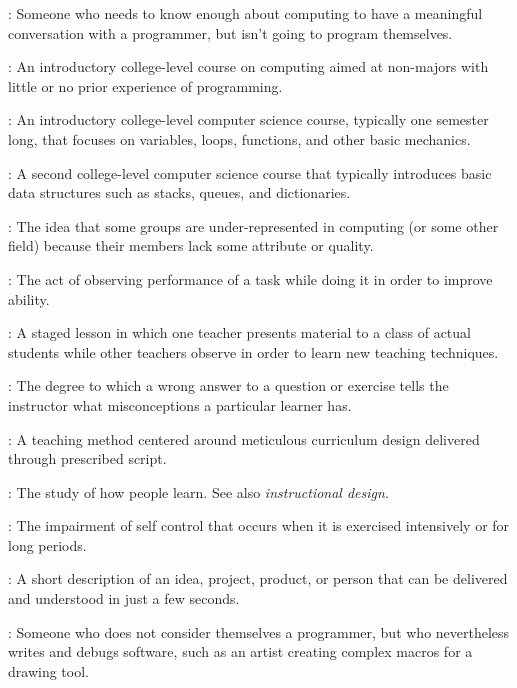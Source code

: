 \begin{description}
:
Someone who needs to know enough about computing to have a meaningful
conversation with a programmer, but isn't going to program themselves.

: An introductory college-level course on
computing aimed at non-majors with little or no prior experience of
programming.

: An introductory college-level computer science
course, typically one semester long, that focuses on variables, loops,
functions, and other basic mechanics.

: A second college-level computer science course
that typically introduces basic data structures such as stacks, queues,
and dictionaries.

: The idea that some groups
are under-represented in computing (or some other field) because their
members lack some attribute or quality.

: The act of
observing performance of a task while doing it in order to improve
ability.

: A staged
lesson in which one teacher presents material to a class of actual
students while other teachers observe in order to learn new teaching
techniques.

: The degree to which a
wrong answer to a question or exercise tells the instructor what
misconceptions a particular learner has.

: A teaching method
centered around meticulous curriculum design delivered through
prescribed script.

: The study
of how people learn. See also \emph{instructional design}.

: The impairment of self
control that occurs when it is exercised intensively or for long
periods.

: A short description of an
idea, project, product, or person that can be delivered and understood
in just a few seconds.

: Someone who
does not consider themselves a programmer, but who nevertheless writes
and debugs software, such as an artist creating complex macros for a
drawing tool.


\end{description}
